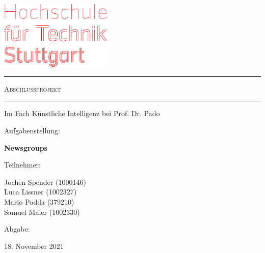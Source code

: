 \documentclass[
	11pt,
	a4paper
]{scrartcl}
\begin{document}
\begin{titlepage}
	\makeatletter
  	\begin{center}   
       \includegraphics[width=0.4\textwidth]{figures/HFT-logo-gross-Aplusheadline.jpg}
       \vspace{2cm}
       
       \textcolor{hft}{\hrule}
       \vspace{0.5cm}
       {\Huge\scshape Abschlussprojekt}
       \vspace{0.5cm}
       \textcolor{hft}{\hrule}
            
       \vspace{2cm}
       {\large Im Fach Künstliche Intelligenz bei Prof. Dr. Pado}
       \vspace{2cm}
       
       
       \begin{flushleft}\quad Aufgabenstellung:\end{flushleft}
       {\large \textbf{Newsgroups}}
       \vspace{1cm}
       
       \begin{flushleft}\quad Teilnehmer:\end{flushleft}
       {\large Jochen Spender (1000146)}\\\vspace{0.1cm}
       {\large Luca Lissner (1002327)}\\\vspace{0.1cm}
       {\large Mario Podda (379210)}\\\vspace{0.1cm}
       {\large Samuel Maier (1002330)}
       \vspace{1cm}
       
       \begin{flushleft}\quad Abgabe:\end{flushleft}
       {\large 18. November 2021}
   \end{center}
\end{titlepage}

\end{document}
